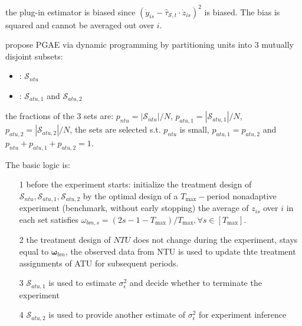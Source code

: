 \documentclass[twoside]{article}
\begin{document}
the plug-in estimator is biased since $\left(\dot{y}_{is}-\hat{\tau}_{\mathcal{S},t}\cdot \dot{z}_{is}\right)^2$ is biased. The bias is squared and cannot be averaged out over $i$.

\citet{xiong2024optimal} propose PGAE via dynamic programming by partitioning units into 3 mutually disjoint subsets:
\begin{itemize}
    \item {}: $\mathcal{S}_{ntu}$
    \item {}: $\mathcal{S}_{atu,1}$ and $\mathcal{S}_{atu,2}$
\end{itemize}
the fractions of the 3 sets are: $p_{ntu}=\left\vert \mathcal{S}_{ntu} \right\vert/N$, $p_{atu,1}=\left\vert \mathcal{S}_{atu,1} \right\vert/N$, $p_{atu,2}=\left\vert \mathcal{S}_{atu,2} \right\vert/N$, the sets are selected s.t. $p_{ntu}$ is small, $p_{atu,1}=p_{atu,2}$ and $p_{ntu}+p_{atu,1}+p_{atu,2}=1$.

The basic logic is: 
\begin{itemize}
    \item[1] before the experiment starts: initialize the treatment design of $\mathcal{S}_{ntu},\mathcal{S}_{atu,1},\mathcal{S}_{atu,2}$ by the optimal design of a $T_{\max}-$period nonadaptive experiment (benchmark, without early stopping)
    the average of $z_{is}$ over $i$ in each set satisfies $\omega_{bm,s}=(2s-1-T_{\max})/T_{\max},\forall s\in[T_{\max}]$.
    \item[2] the treatment design of $NTU$ does not change during the experiment, stays equal to $\boldsymbol{\omega}_{bm}$, the observed data from NTU is used to update thte treatment assignments of ATU for subsequent periods.
    \item[3] $\mathcal{S}_{atu,1}$ is used to estimate $\sigma^2_{\epsilon}$ and decide whether to terminate the experiment 
    \item[4] $\mathcal{S}_{atu,2}$ is used to provide another estimate of $\sigma^2_{\epsilon}$ for experiment inference
\end{itemize}
\end{document}
